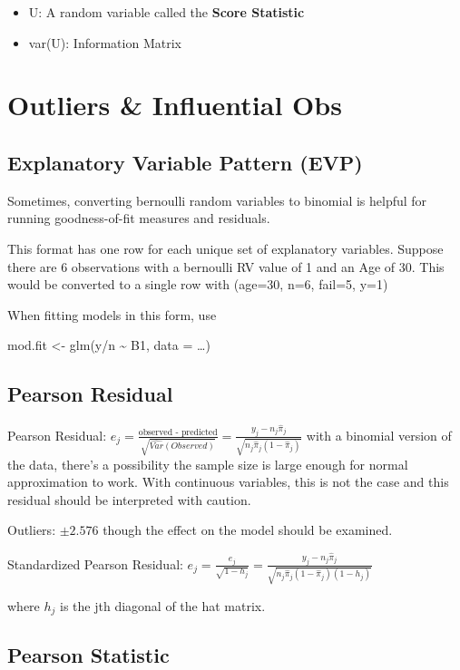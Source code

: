 \documentclass[11pt]{article}
\begin{document}
\begin{itemize}
\item U: A random variable called the \textbf{Score Statistic}
\item var(U): Information Matrix
\end{itemize}
\section{Outliers \& Influential Obs}
\label{sec:org1082f63}
\subsection{Explanatory Variable Pattern (EVP)}
\label{sec:org703ef13}
Sometimes, converting bernoulli random variables to binomial is helpful for
running goodness-of-fit measures and residuals.

This format has one row for each unique set of explanatory variables. Suppose
there are 6 observations with a bernoulli RV value of 1 and an Age of 30. This
would be converted to a single row with (age=30, n=6, fail=5, y=1)

When fitting models in this form, use
\begin{R}
mod.fit <- glm(y/n \textasciitilde{} B1, data = \ldots{})
\end{R}
\subsection{Pearson Residual}
\label{sec:orgd08bfa8}
Pearson Residual: \(e_j = \frac{\text{observed -
predicted}}{\sqrt{\hat{Var}(Observed)}} = \frac{y_j - n_j \hat \pi_j}{\sqrt{n_j
\hat \pi_j (1 - \hat \pi_j)}}\)
with a binomial version of the data, there's a possibility the sample size is
large enough for normal approximation to work. With continuous variables, this
is not the case and this residual should be interpreted with caution.

Outliers: \(\pm 2.576\) though the effect on the model should be examined.

Standardized Pearson Residual: \(e_j = \frac{e_j}{\sqrt{1 - h_j}} = \frac{y_j -
n_j \hat \pi_j}{\sqrt{n_j \hat \pi_j (1 - \hat \pi_j)(1 - h_j)}}\)

where \(h_j\) is the jth diagonal of the hat matrix.
\subsection{Pearson Statistic}
\label{sec:orgd679246}
\end{document}
